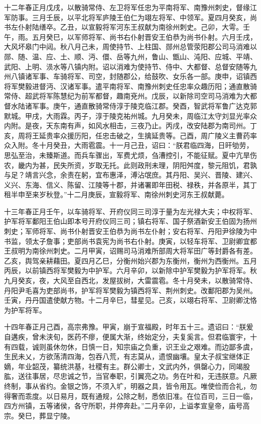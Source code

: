 \documentclass[]{article}
\begin{document}
十二年春正月戊戌，以散骑常侍、左卫将军任忠为平南将军、南豫州刺史，督缘江军防事。三月壬辰，以平北将军庐陵王伯仁为翊左将军、中领军。夏四月癸亥，尚书左仆射陆缮卒。乙丑，以宣毅将军河东王叔献为南徐州刺史。己卯，大雩。壬午，雨。五月癸巳，以军师将军、尚书右仆射晋安王伯恭为尚书仆射。六月壬戌，大风坏皋门中闼。秋八月己未，周使持节、上柱国、郧州总管荥阳郡公司马消难以郧、随、温、应、土、顺、沔、儇、岳等九州，鲁山、甑山、沌阳、应城、平靖、武阳、上明、涢水等八镇内附。诏以消难为使持节、侍中、大都督、总督安随等九州八镇诸军事、车骑将军、司空，封随郡公，给鼓吹、女乐各一部。庚申，诏镇西将军樊毅进督沔、汉诸军事。遣平南将军、南豫州刺史任忠率众趣历阳；通直散骑常侍、超武将军陈慧纪为前军都督，趣南兗州。戊辰，以新除司空司马消难为大都督水陆诸军事。庚午，通直散骑常侍淳于陵克临江郡。癸酉，智武将军鲁广达克郭默城。甲戌，大雨霖。丙子，淳于陵克祐州城。九月癸未，周临江太守刘显光率众内附。是夜，天东南有声，如风水相击，三夜乃止。丙戌，改安陆郡为南司州。丁亥，周将王延贵率众援历阳，任忠击破之，生擒延贵等。己酉，周广陵义主曹药率众入附。冬十月癸丑，大雨雹震。十一月己丑，诏曰：``朕君临四海，日旰劬劳，思弘至治，未臻斯道。而兵车骤出，军费尤烦，刍漕控引，不能征赋。夏中亢旱伤农，畿内为甚，民失所资，岁取无托。此则政刑未理，阴阳舛度，黎元阻饥，君孰与足？靖言兴念，余责在躬，宜布惠泽，溥沾氓庶。其丹阳、吴兴、晋陵、建兴、义兴、东海、信义、陈留、江陵等十郡，并诸署即年田税、禄秩，并各原半，其丁租半申至来岁秋登。''十二月庚辰，宣毅将军、南徐州刺史河东王叔献薨。

十三年春正月壬午，以车骑将军、开府仪同三司淳于量为左光禄大夫；中权将军、护军将军鄱阳王伯山即本号开府仪同三司；镇右将军、国子祭酒新安王伯固为扬州刺史；军师将军、尚书仆射晋安王伯恭为尚书左仆射；安右将军、丹阳尹徐陵为中书监，领太子詹事；吏部尚书袁宪为尚书右仆射。庚寅，以轻车将军、卫尉卿宜都王叔明为南徐州刺史。二月甲寅，诏赐司马消难所部周大将军田广等封爵各有差。乙亥，舆驾亲耕藉田。夏四月乙巳，分衡州始兴郡为东衡州，衡州为西衡州。五月丙辰，以前镇西将军樊毅为中护军。六月辛卯，以新除中护军樊毅为护军将军。秋九月癸亥，夜，大风至自西北，发屋拔树，大雷震雹。冬十月癸未，以散骑常侍、丹阳尹毛喜为吏部尚书，护军将军樊毅为镇西将军、荆州刺史。改鄱阳郡为吴州。壬寅，丹丹国遣使献方物。十二月辛巳，彗星见。己亥，以翊右将军、卫尉卿沈恪为护军将军。

十四年春正月己酉，高宗弗豫。甲寅，崩于宣福殿，时年五十三。遗诏曰：``朕爰自遘疾，曾未浃旬，医药不瘳，便属大渐，终始定分，夫复奚言。但君临寰宇，十有四载，诚则虽休勿休，日慎一日，知宗庙之负重，识王业之艰难。而边鄙多虞，生民未乂，方欲荡清四海，包吞八荒，有志莫从，遗恨幽壤。皇太子叔宝继体正嫡，年业韶茂，纂统洪基，社稷有主。群公卿士，文武内外，俱罄心力，同竭股肱，送往事居，尽忠诚之节，当官奉职，引翼亮之功。务在叶和，无违朕意。凡厥终制，事从省约。金银之饰，不须入圹，明器之具，皆令用瓦。唯使俭而合礼，勿得奢而乖度。以日易月，既有通规，公除之制，悉依旧准。在位百司，三日一临，四方州镇，五等诸侯，各守所职，并停奔赴。''二月辛卯，上谥孝宣皇帝，庙号高宗。癸巳，葬显宁陵。
\end{document}
